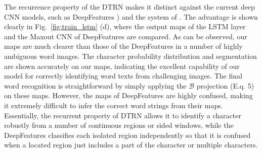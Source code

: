 \documentclass[letterpaper]{article}
\begin{document}
The recurrence property of the DTRN makes it distinct against the current deep CNN models, such as DeepFeatures \cite{Jaderberg2014}) and the system of \cite{Wang2012}. The advantage is shown clearly in Fig.~\ref{fig:train_lstm} (d), where the output maps of the LSTM layer and the Maxout CNN of DeepFeatures are compared. As can be observed, our maps are much clearer than those of the DeepFeatures in a number of highly ambiguous word images.
%
The character probability distribution and segmentation are shown accurately on our maps, indicating the excellent capability of our model for correctly identifying word texts from challenging images. The final word recognition is straightforward by simply applying the $\mathcal{B}$ projection (E.q. 5) on these maps.
However, the maps of DeepFeatures are highly confused, making it extremely difficult to infer the correct word strings from their maps.
Essentially, the recurrent property of DTRN allows it to identify a character robustly from a number of continuous regions or sided windows, while the DeepFeatures classifies each isolated region independently so that it is confused when a located region just includes a part of the character or multiple characters.

%
%
%
\end{document}
